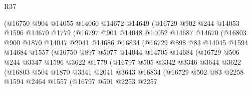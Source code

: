 \begin{lexlean}{R37}
\begin{coremodule}
                    (@16750
                      @904
                      @14055
                      @14060
                      @14672
                      @14649
                      (@16729
                        @902
                        @244
                        @14053
                        @1596
                        @14670
                        @1779
                        (@16797
                          @901
                          @14048
                          @14052
                          @14687
                          @14670
                          (@16803
                            @900
                            @1870
                            @14047
                            @2041
                            @14686
                            @16834
                            (@16729
                              @898
                              @83
                              @14045
                              @1594
                              @14684
                              @1557
                              (@16750
                                @897
                                @5077
                                @14044
                                @14705
                                @14684
                                (@16729
                                  @506
                                  @244
                                  @3347
                                  @1596
                                  @3622
                                  @1779
                                  (@16797
                                    @505
                                    @3342
                                    @3346
                                    @3644
                                    @3622
                                    (@16803
                                      @504
                                      @1870
                                      @3341
                                      @2041
                                      @3643
                                      @16834
                                      (@16729
                                        @502
                                        @83
                                        @2258
                                        @1594
                                        @2464
                                        @1557
                                        (@16797
                                          @501
                                          @2253
                                          @2257

\end{coremodule}
\end{lexlean}
